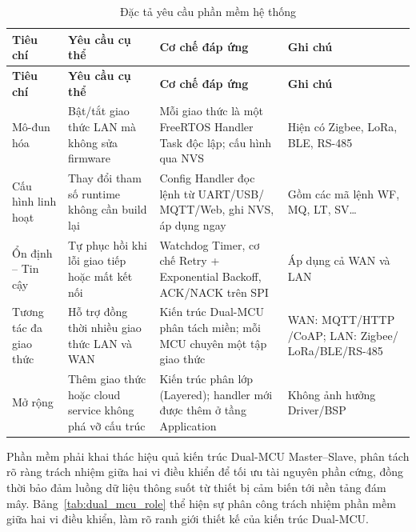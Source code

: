         \begin{longtable}{|p{}|p{}|p{}|p{}|}
            \caption{Đặc tả yêu cầu phần mềm hệ thống}
            \label{tab:software_spec} \\

            \hline
            \textbf{Tiêu chí} & \textbf{Yêu cầu cụ thể} & \textbf{Cơ chế đáp ứng} & \textbf{Ghi chú} \\ \hline
            \endfirsthead

            \hline
            \textbf{Tiêu chí} & \textbf{Yêu cầu cụ thể} & \textbf{Cơ chế đáp ứng} & \textbf{Ghi chú} \\ \hline
            \endhead

            Mô-đun hóa & Bật/tắt giao thức LAN mà không sửa firmware & Mỗi giao thức là một FreeRTOS Handler Task độc lập; cấu hình qua NVS & Hiện có Zigbee, LoRa, BLE, RS-485 \\ \hline

            Cấu hình linh hoạt & Thay đổi tham số runtime không cần build lại & Config Handler đọc lệnh từ UART/USB/ \newline MQTT/Web, ghi NVS, áp dụng ngay & Gồm các mã lệnh WF, MQ, LT, SV\dots \\ \hline
            
            Ổn định -- Tin cậy & Tự phục hồi khi lỗi giao tiếp hoặc mất kết nối & Watchdog Timer, cơ chế Retry + Exponential Backoff, ACK/NACK trên SPI & Áp dụng cả WAN và LAN \\ \hline
            
            Tương tác đa giao thức & Hỗ trợ đồng thời nhiều giao thức LAN và WAN & Kiến trúc Dual-MCU phân tách miền; mỗi MCU chuyên một tập giao thức & WAN: MQTT/HTTP \newline /CoAP; LAN: Zigbee/ \newline LoRa/BLE/RS-485 \\ \hline
            
            Mở rộng & Thêm giao thức hoặc cloud service không phá vỡ cấu trúc & Kiến trúc phân lớp (Layered); handler mới được thêm ở tầng Application & Không ảnh hưởng Driver/BSP \\ \hline

        \end{longtable}

        Phần mềm phải khai thác hiệu quả kiến trúc Dual-MCU Master--Slave, phân tách rõ ràng trách nhiệm giữa hai vi điều khiển để tối ưu tài nguyên phần cứng, đồng thời bảo đảm luồng dữ liệu thông suốt từ thiết bị cảm biến tới nền tảng đám mây. Bảng~\ref{tab:dual_mcu_role} thể hiện sự phân công trách nhiệm phần mềm giữa hai vi điều khiển, làm rõ ranh giới thiết kế của kiến trúc Dual-MCU.

